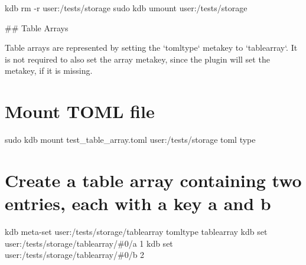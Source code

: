 kdb rm -\/r user\+:/tests/storage sudo kdb umount user\+:/tests/storage 
\begin{DoxyCode}
## Table Arrays

Table arrays are represented by setting the `tomltype` metakey to `tablearray`. It is not required to also
       set the array metakey, since the plugin will set the metakey, if it is missing.
\end{DoxyCode}
 \hypertarget{autotoc_md642_autotoc_md713}{}\section{Mount T\+O\+M\+L file}\label{autotoc_md642_autotoc_md713}
sudo kdb mount test\+\_\+table\+\_\+array.\+toml user\+:/tests/storage toml type\hypertarget{autotoc_md642_autotoc_md714}{}\section{Create a table array containing two entries, each with a key \textquotesingle{}a\textquotesingle{} and \textquotesingle{}b\textquotesingle{}}\label{autotoc_md642_autotoc_md714}
kdb meta-\/set \textquotesingle{}user\+:/tests/storage/tablearray\textquotesingle{} \textquotesingle{}tomltype\textquotesingle{} \textquotesingle{}tablearray\textquotesingle{} kdb set \textquotesingle{}user\+:/tests/storage/tablearray/\#0/a\textquotesingle{} \textquotesingle{}1\textquotesingle{} kdb set \textquotesingle{}user\+:/tests/storage/tablearray/\#0/b\textquotesingle{} \textquotesingle{}2\textquotesingle{}


